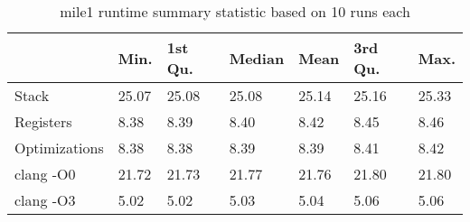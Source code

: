 \begin{table}[h!]
\centering
\begin{tabular}{p{}p{}p{}p{}p{}p{}p{}}
  \hline
 & Min. & 1st Qu. & Median & Mean & 3rd Qu. & Max. \\ 
  \hline
Stack & 25.07 & 25.08 & 25.08 & 25.14 & 25.16 & 25.33 \\ 
  Registers & 8.38 & 8.39 & 8.40 & 8.42 & 8.45 & 8.46 \\ 
  Optimizations & 8.38 & 8.38 & 8.39 & 8.39 & 8.41 & 8.42 \\ 
  clang -O0 & 21.72 & 21.73 & 21.77 & 21.76 & 21.80 & 21.80 \\ 
  clang -O3 & 5.02 & 5.02 & 5.03 & 5.04 & 5.06 & 5.06 \\ 
   \hline
\end{tabular}
\caption{mile1 runtime summary statistic based on 10 runs each}
\end{table}
